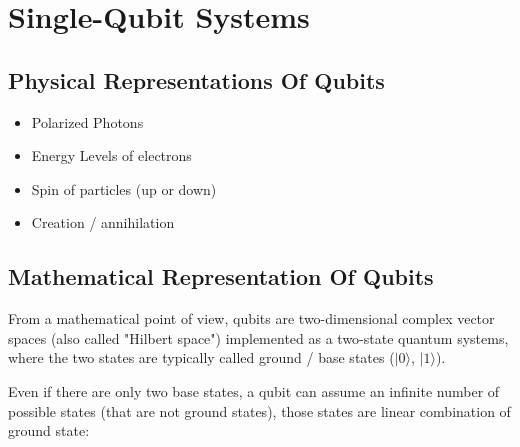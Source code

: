 \documentclass[12pt,a4paper]{report}
\begin{document}
\pagebreak
\section{Single-Qubit Systems}
\subsection{Physical Representations Of Qubits}
\begin{itemize}
\item Polarized Photons
\item Energy Levels of electrons
\item Spin of particles (up or down)
\item Creation / annihilation
\end{itemize}

\subsection{Mathematical Representation Of Qubits}
From a mathematical point of view, qubits are two-dimensional complex vector spaces (also called "Hilbert space") implemented as a two-state quantum systems, where the two states are typically called ground / base states ($ |0\rangle $, $ |1\rangle $).

Even if there are only two base states, a qubit can assume an infinite number of possible states (that are not ground states), those states are linear combination of ground state: 
\end{document}
